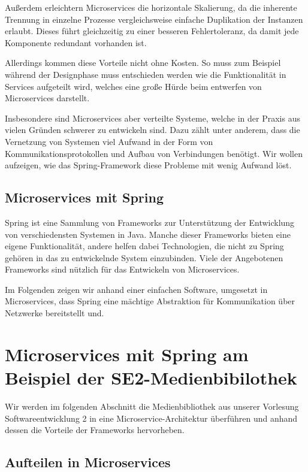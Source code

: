 \documentclass{article}
\begin{document}
Außerdem erleichtern Microservices die horizontale Skalierung, da die inherente Trennung in einzelne Prozesse vergleichsweise einfache Duplikation der Instanzen erlaubt.
Dieses führt gleichzeitig zu einer besseren Fehlertoleranz, da damit jede Komponente redundant vorhanden ist.\cite{OMA}

Allerdings kommen diese Vorteile nicht ohne Kosten.
So muss zum Beispiel während der Designphase muss entschieden werden wie die Funktionalität in Services aufgeteilt wird, welches eine große Hürde beim entwerfen von Microservices darstellt.\cite{SCASASD}

Insbesondere sind Microservices aber verteilte Systeme, welche in der Praxis aus vielen Gründen schwerer zu entwickeln sind.\cite{MATT}
Dazu zählt unter anderem, dass die Vernetzung von Systemen viel Aufwand in der Form von Kommunikationsprotokollen und Aufbau von Verbindungen benötigt.
Wir wollen aufzeigen, wie das Spring-Framework diese Probleme mit wenig Aufwand löst.

\subsection{Microservices mit Spring}

Spring ist eine Sammlung von Frameworks zur Unterstützung der Entwicklung von verschiedensten Systemen in Java.
Manche dieser Frameworks bieten eine eigene Funktionalität, andere helfen dabei Technologien, die nicht zu Spring gehören in das zu entwickelnde System einzubinden.
Viele der Angebotenen Frameworks sind nützlich für das Entwickeln von Microservices.

Im Folgenden zeigen wir anhand einer einfachen Software, umgesetzt in Microservices, dass Spring eine mächtige Abstraktion für Kommunikation über Netzwerke bereitstellt und.

\section{Microservices mit Spring am Beispiel der SE2-Medienbibilothek}

Wir werden im folgenden Abschnitt die Medienbibliothek aus unserer Vorlesung Softwareentwicklung 2 in eine Microservice-Architektur überführen und anhand dessen die Vorteile der Frameworks hervorheben.

\subsection{Aufteilen in Microservices}
\end{document}

